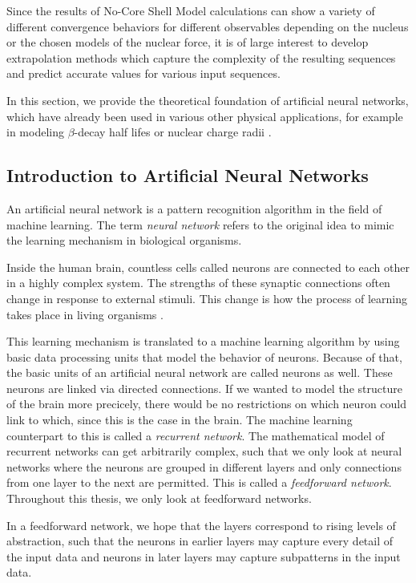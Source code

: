
Since the results of No-Core Shell Model calculations can show a variety of different convergence behaviors for different observables depending on the nucleus or the chosen models of the nuclear force, it is of large interest to develop extrapolation methods which capture the complexity of the resulting sequences and predict accurate values for various input sequences.

In this section, we provide the theoretical foundation of artificial neural networks, which have already been used in various other physical
applications, for example in modeling $\beta$-decay half lifes \cite{nnbetadecay} or nuclear charge radii \cite{Akkoyun_2013}.

\subsection{Introduction to Artificial Neural Networks}

An artificial neural network is a pattern recognition algorithm in the field of machine learning. The term \textit{neural network} refers to the original idea to mimic the learning mechanism in biological organisms.

Inside the human brain, countless cells called neurons are connected to each other in a highly complex system. The strengths of these synaptic connections often change in response to external stimuli. This change is how the process of learning takes place in living organisms \cite{Aggarwal2018}.

This learning mechanism is translated to a machine learning algorithm by using basic data processing units that model the behavior of neurons. Because of that, the basic units of an artificial neural network are called neurons as well. These neurons are linked via directed connections. If we wanted to model the structure of the brain more precicely, there would be no restrictions on which neuron could link to which, since this is the case in the brain. The machine learning counterpart to this is called a \textit{recurrent network}. The mathematical model of recurrent networks can get arbitrarily complex, such that we only look at neural networks where the neurons are grouped in different layers and only connections from one layer to the next are permitted. This is called a \textit{feedforward network}. Throughout this thesis, we only look at feedforward networks.

In a feedforward network, we hope that the layers correspond to rising levels of abstraction, such that the neurons in earlier layers may capture every detail of the input data and neurons in later layers may capture subpatterns in the input data.


